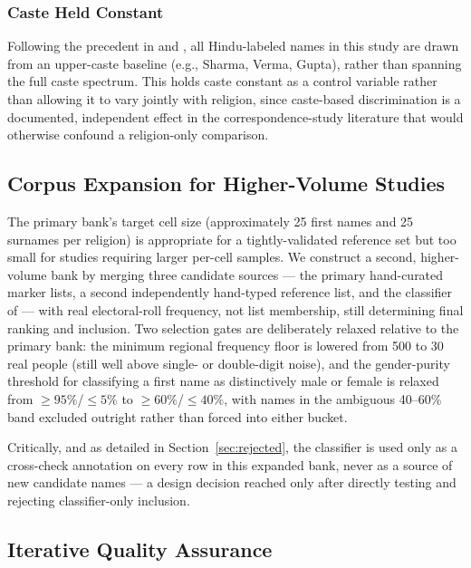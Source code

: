 \documentclass[11pt]{article}
\begin{document}
\subsubsection{Caste Held Constant}
\label{sec:caste}

Following the precedent in \citet{thoratAttewell2007} and \citet{banerjee2009}, all Hindu-labeled names in this study are drawn from an upper-caste baseline (e.g., Sharma, Verma, Gupta), rather than spanning the full caste spectrum. This holds caste constant as a control variable rather than allowing it to vary jointly with religion, since caste-based discrimination is a documented, independent effect in the correspondence-study literature that would otherwise confound a religion-only comparison.

\subsection{Corpus Expansion for Higher-Volume Studies}
\label{sec:expansion}

The primary bank's target cell size (approximately 25 first names and 25 surnames per religion) is appropriate for a tightly-validated reference set but too small for studies requiring larger per-cell samples. We construct a second, higher-volume bank by merging three candidate sources --- the primary hand-curated marker lists, a second independently hand-typed reference list, and the classifier of \citet{chaturvedi2023} --- with real electoral-roll frequency, not list membership, still determining final ranking and inclusion. Two selection gates are deliberately relaxed relative to the primary bank: the minimum regional frequency floor is lowered from 500 to 30 real people (still well above single- or double-digit noise), and the gender-purity threshold for classifying a first name as distinctively male or female is relaxed from $\geq 95\%$/$\leq 5\%$ to $\geq 60\%$/$\leq 40\%$, with names in the ambiguous 40--60\% band excluded outright rather than forced into either bucket.

Critically, and as detailed in Section~\ref{sec:rejected}, the classifier is used only as a cross-check annotation on every row in this expanded bank, never as a source of new candidate names — a design decision reached only after directly testing and rejecting classifier-only inclusion.

\subsection{Iterative Quality Assurance}
\label{sec:qa}
\end{document}
